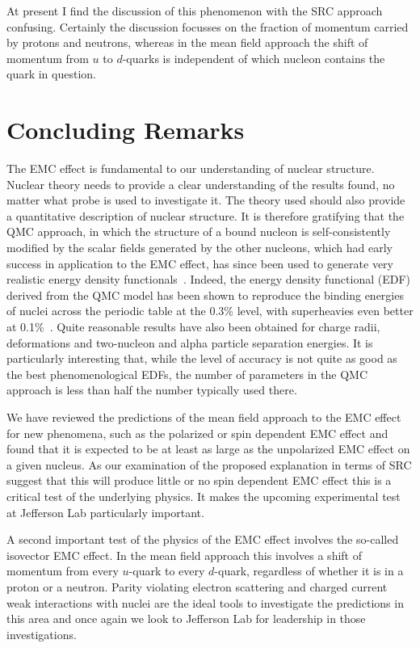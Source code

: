 \documentclass{ws-ijmpe}
\begin{document}
At present I find the discussion of this phenomenon with the SRC approach confusing. Certainly the discussion focusses on the fraction of momentum carried by protons and neutrons, whereas in the mean field approach the shift of momentum from $u$ to $d$-quarks is independent of which nucleon contains the quark in question.

\section{Concluding Remarks}
The EMC effect is fundamental to our understanding of nuclear structure. Nuclear theory needs to provide a clear understanding of the results found, no matter what probe is used to investigate it. The theory used should also provide a quantitative description of nuclear structure. It is therefore gratifying that the QMC approach, in which the structure of a bound nucleon is self-consistently modified by the scalar fields generated by the other nucleons, which had early success in application to the EMC effect, has since been used to generate very realistic energy 
density functionals~\cite{Guichon:2006er,Guichon:2004xg}. Indeed, the energy density functional (EDF) derived from the QMC model has been shown to reproduce the binding energies of nuclei across the periodic table at the 0.3\% level, with superheavies even better at 0.1\%~\cite{Stone:2016qmi,Stone:2017oqt,Guichon:2018uew}. Quite reasonable results have also been obtained for charge radii, deformations and two-nucleon and alpha particle separation energies. It is particularly interesting that, while the level of accuracy is not quite as good as the best phenomenological EDFs, the number of parameters in the QMC approach is less than half the number typically used there. 

We have reviewed the predictions of the mean field approach to the EMC effect for new phenomena, such as the polarized  or spin dependent EMC effect and found that it is expected to be at least as large as the unpolarized EMC effect on a given nucleus. As our examination of the proposed explanation in terms of SRC suggest that this will produce little or no spin dependent EMC effect this is a critical test of the underlying physics. It makes the upcoming experimental test at Jefferson Lab particularly important.

A second important test of the physics of the EMC effect involves the so-called isovector EMC effect. In the mean field approach this involves a shift of momentum from every $u$-quark to every $d$-quark, regardless of whether it is in a proton or a neutron. Parity violating electron scattering and charged current weak interactions with nuclei are the ideal tools to investigate the predictions in this area and once again we look to Jefferson Lab for leadership in those investigations. 
\end{document}
